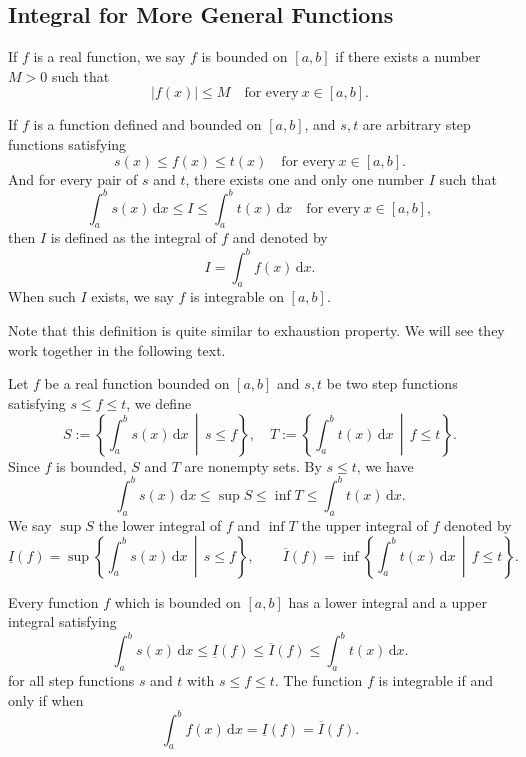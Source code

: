 \documentclass[a4paper]{ctexart}
\begin{document}
	\subsection{Integral for More General Functions}
	\begin{mydef}
		If $f$ is a real function, we say $f$ is bounded on $[a,b]$ if there exists a number $M>0$ such that  
		\[
		|f(x)|\le M \quad \text{for every}\ x\in [a,b].
		\]
	\end{mydef}
	\begin{mydef}
		If $f$ is a function defined and bounded on $[a,b]$, and $s,t$ are arbitrary step functions satisfying
		\[ s(x)\le f(x)\le t(x) \quad \text{for every}\ x\in[a,b].\]
		And for every pair of $s$ and $t$, there exists one and only one number $I$ such that
		\[\int_a^b s(x)\,\mathrm{d}x\le I \le \int_a^b t(x)\,\mathrm{d}x \quad \text{for every}\ x\in[a,b],\]
		then $I$ is defined as the integral of $f$ and denoted by
		\[ I=\int_a^b f(x)\,\mathrm{d}x.\]
		When such $I$ exists, we say $f$ is integrable on $[a,b]$.
	\end{mydef}
	\begin{myrmk}
		Note that this definition is quite similar to exhaustion property. We will see they work together in the following text.
	\end{myrmk}
	\begin{mydef}
		Let $f$ be a real function bounded on $[a,b]$ and $s,t$ be two step functions satisfying $s\le f\le t$, we define
		\[
		S:=\left\{\int_a^b s(x)\,\mathrm{d}x\, \middle|\, s\le f\right\},
		\quad
		T:=\left\{\int_a^b t(x)\,\mathrm{d}x\, \middle|\, f\le t\right\}.
		\]
		Since $f$ is bounded, $S$ and $T$ are nonempty sets. By $s\le t$, we have 
		\[
		\int_a^b s(x)\,\mathrm{d}x \le \sup S\le \inf T\le \int_a^b t(x)\,\mathrm{d}x.
		\]
		We say $\sup S$ the lower integral of $f$ and $\inf T$ the upper integral of $f$ denoted by
		\[
		\underline{I}(f) = \sup \left\{ \int_a^b s(x) \, \mathrm{d}x \,\middle|\, s \le f \right\}, 
		\qquad 
		\overline{I}(f) = \inf \left\{ \int_a^b t(x) \, \mathrm{d}x \,\middle|\, f \le t \right\}.
		\]
	\end{mydef}
	\begin{mythm}
		Every function $f$ which is bounded on $[a,b]$ has a lower integral and a upper integral satisfying
		\[
		\int_a^b s(x) \, \mathrm{d}x 
		\le \underline{I}(f) 
		\le \overline{I}(f) 
		\le \int_a^b t(x) \, \mathrm{d}x.
		\]
		for all step functions $s$ and $t$ with $s\le f\le t$. The function $f$ is integrable if and only if when
		\[
		\int_a^b f(x) \, \mathrm{d}x = \underline{I}(f) = \overline{I}(f).
		\]
	\end{mythm}
\end{document}
